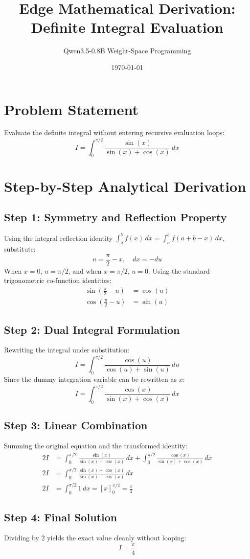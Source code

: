 \documentclass[12pt]{article}
\title{Edge Mathematical Derivation: Definite Integral Evaluation}
\author{Qwen3.5-0.8B Weight-Space Programming}
\date{\today}
\begin{document}
\maketitle

\section*{Problem Statement}
Evaluate the definite integral without entering recursive evaluation loops:
\begin{equation}
I = \int_{0}^{\pi/2} \frac{\sin(x)}{\sin(x) + \cos(x)} \, dx
\end{equation}

\section*{Step-by-Step Analytical Derivation}

\subsection*{Step 1: Symmetry and Reflection Property}
Using the integral reflection identity $\int_{a}^{b} f(x) \, dx = \int_{a}^{b} f(a + b - x) \, dx$, substitute:
\begin{equation}
u = \frac{\pi}{2} - x, \quad dx = -du
\end{equation}
When $x = 0$, $u = \pi/2$, and when $x = \pi/2$, $u = 0$. Using the standard trigonometric co-function identities:
\begin{align*}
\sin\left(\frac{\pi}{2} - u\right) &= \cos(u) \\
\cos\left(\frac{\pi}{2} - u\right) &= \sin(u)
\end{align*}

\subsection*{Step 2: Dual Integral Formulation}
Rewriting the integral under substitution:
\begin{equation}
I = \int_{0}^{\pi/2} \frac{\cos(u)}{\cos(u) + \sin(u)} \, du
\end{equation}
Since the dummy integration variable can be rewritten as $x$:
\begin{equation}
I = \int_{0}^{\pi/2} \frac{\cos(x)}{\sin(x) + \cos(x)} \, dx
\end{equation}

\subsection*{Step 3: Linear Combination}
Summing the original equation and the transformed identity:
\begin{align*}
2I &= \int_{0}^{\pi/2} \frac{\sin(x)}{\sin(x) + \cos(x)} \, dx + \int_{0}^{\pi/2} \frac{\cos(x)}{\sin(x) + \cos(x)} \, dx \\
2I &= \int_{0}^{\pi/2} \frac{\sin(x) + \cos(x)}{\sin(x) + \cos(x)} \, dx \\
2I &= \int_{0}^{\pi/2} 1 \, dx = \left[ x \right]_{0}^{\pi/2} = \frac{\pi}{2}
\end{align*}

\subsection*{Step 4: Final Solution}
Dividing by 2 yields the exact value cleanly without looping:
\begin{equation}
\boxed{I = \frac{\pi}{4}}
\end{equation}
\end{document}
